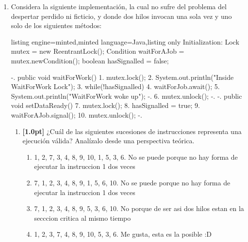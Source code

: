 \documentclass[a4paper,11pt]{article}
\begin{document}
    \begin{enumerate}
        \item Considera la siguiente implementación, la cual no sufre del problema del despertar perdido ni ficticio, 
        y donde dos hilos invocan una sola vez y uno solo de los siguientes métodos:
        
        \begin{tcblisting}{listing engine=minted,minted language=Java,listing only}
            Initialization:
            Lock mutex = new ReentrantLock();
            Condition waitForAJob = mutex.newCondition();
            boolean hasSignalled = false;
                
            -.  public void waitForWork() {
            1.    mutex.lock();
            2.    System.out.println("Inside WaitForWork Lock");
            3.    while(!hasSignalled) {
            4.      waitForJob.await();
            5.      System.out.println("WaitForWork woke up");
            -.    }
            6.    mutex.unlock();
            -.  }
            -.  public void setDataReady() {
            7.   mutex.lock();
            8.   hasSignalled = true;
            9.   waitForAJob.signal();
            10.   mutex.unlock();
            -.  }
        \end{tcblisting}

            \begin{enumerate}
                \item 
                    \textbf{[1.0pt]} ¿Cuál de las siguientes sucesiones de instrucciones representa una
                    ejecución válida? Analízalo desde una perspectiva teórica.
                        \begin{enumerate}
                            \item 1, 2, 7, 3, 4, 8, 9, 10, 1, 5, 3, 6. 
                            No se puede porque no hay forma de ejecutar
                            la instruccion 1 dos veces

                            \item 7, 1, 2, 3, 4, 8, 9, 1, 5, 6, 10. 
                            No se puede porque no hay forma de ejecutar
                            la instruccion 1 dos veces

                            \item 7, 1, 2, 3, 4, 8, 9, 5, 3, 6, 10. 
                            No porque de ser asi dos hilos estan en la secccion critica al mismo tiempo

                            \item 1, 2, 3, 7, 4, 8, 9, 10, 5, 3, 6. 
                            Me gusta, esta es la posible :D


\end{enumerate}
\end{enumerate}
\end{enumerate}
\end{document}
